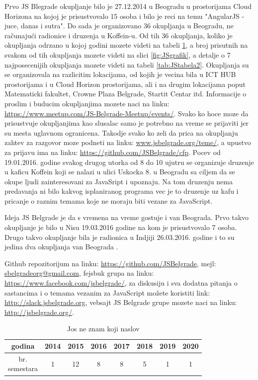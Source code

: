 \documentclass[a4paper]{article}
\begin{document}
{Prvo JS Blegrade okupljanje bilo je 27.12.2014 u Beogradu u prostorijama Cloud Horizona na kojoj je prisustvovalo 15 osoba i bilo je reci na temu "AngularJS - juce, danas i sutra". Do sada je organizovano 36 okupljanja u Beogradu, ne računajući radionice i druzenja u Koffein-u. Od tih 36 okupljanja, koliko je okupljanja odrzano u kojoj godini mozete videti na tabeli \ref{tab:JStabela1}, a broj prisutnih na svakom od tih okupljanja mozete videti na slici \ref{fig:JSgrafik}, a detalje o 7 najposecenijih okupljanja mozete videti na tabeli \ref{tab:JStabela2}. Okupljanja su se organizovala na razlicitim lokacijama, od kojih je vecina bila u ICT HUB prostorijama i u Cloud Horizon prostorijama, ali i na drugim lokacijama poput Matematicki fakultet, Crowne Plaza Belgrade, Startit Centar itd. Informacije o proslim i buducim okupljanjima mozete naci na linku: \url{https://www.meetup.com/JS-Belgrade-Meetup/events/}. Svako ko hoce moze da prisustvuje okupljanjima kao slusalac samo je potrebno na vreme se prijaviti jer su mesta uglavnom ogranicena. Takodje svako ko zeli da prica na okupljanju zahtev za razgovor moze podneti na linku: \url{www.jsbelgrade.org/teme/}, a upustvo za prijavu ima na linku: \url{https://github.com/JSBelgrade/cfp}. Pocev od 19.01.2016. godine svakog drugog utorka od 8 do 10 ujutru se organizuje druzenje u kaficu Koffein koji se nalazi u ulici Uskocka 8. u Beogradu sa ciljem da se okupe ljudi zainteresovani za JavaSript i upoznaju. Na tom druzenju nema predavanja ni bilo kakvog isplaniranog programa vec je to druzenje uz kafu i pricanje o raznim temama koje ne moraju biti vezane za JavaScript\cite{JS_Belgrade_meetup_events}.

Ideja JS Belgrade je da s vremena na vreme gostuje i van Beograda. Prvo takvo okupljanje je bilo u Nisu 19.03.2016 godine na kom je prisustvovalo 7 osoba. Drugo takvo okupljanje bila je radionica u Indjiji 26.03.2016. godine i to su jedina dva okupljanja van Beograda \cite{JS_Belgrade_meetup_events}.

Github repozitorijum na linku: \url{https://github.com/JSBelgrade}, mejl: \url{sbelgradeorg@gmail.com}, fejsbuk grupa na linku: \url{https://www.facebook.com/jsbelgrade/},
za diskusiju i sva dodatna pitanja o sastancima i o temama vezanim za JavaScript možete koristiti link: \url{http://slack.jsbelgrade.org}, vebsajt JS Belgrade grupe mozete naci na linku: \url{http://jsbelgrade.org/}.

\begin{table}[h!]
\begin{center}
\caption{Jos ne znam koji naslov}
\begin{tabular}{ |c|c|c|c|c|c|c|c| } 
 \hline
 godina & 2014 & 2015 & 2016 & 2017 & 2018 & 2019 & 2020 \\ 
 \hline
 \makecell[c]{br.\\semestara} & 1 & 12 & 8 & 8 & 5 & 1 & 1 \\
 \hline
\end{tabular}
\label{tab:JStabela1}
\end{center}
\end{table}

}
\end{document}

